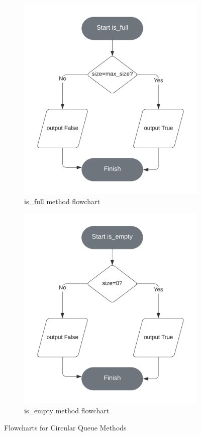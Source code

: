 \documentclass[12pt]{article}
\begin{document}
\begin{figure}[ht]
    \begin{subfigure}{.5\textwidth}
        \centering
        \includegraphics[width=.8\linewidth]{is-full-circular-queue-flowchart}
        \caption{is\_full method flowchart}
    \end{subfigure}%
    \begin{subfigure}{.5\textwidth}
      \centering
      \includegraphics[width=.8\linewidth]{is-empty-circular-queue-flowchart}
        \caption{is\_empty method flowchart}
    \end{subfigure}
    \caption{Flowcharts for Circular Queue Methods}
\end{figure}
\end{document}
